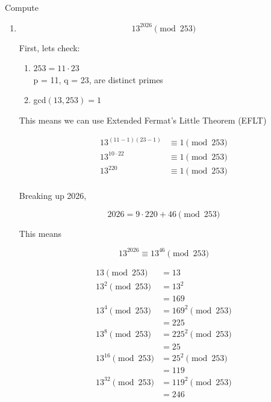 \documentclass[../../Main.tex]{subfiles}
\begin{document}
\begin{example}
    Compute

    \begin{enumerate}
        \item
        {
            $$13^{2026} \pmod{253}$$

            First, lets check:

            \begin{enumerate}
                \item $253 = 11 \cdot 23$ \\ p = 11, q = 23, are distinct primes
                \item gcd$(13, 253) = 1$
            \end{enumerate}

            This means we can use Extended Fermat's Little Theorem (EFLT)

            \begin{align*}
                13^{(11 - 1)(23 - 1)} &\equiv 1 \pmod{253} \\
                13^{10 \cdot 22} &\equiv 1 \pmod{253} \\
                13^{220} &\equiv 1 \pmod{253} \\
            \end{align*}

            Breaking up 2026,

            $$2026 = 9 \cdot 220 + 46 \pmod{253}$$

            This means

            $$13^{2026} \equiv 13^{46} \pmod{253}$$

            \begin{align*}
                13 \pmod{253} &= 13 \\
                13^2 \pmod{253} &= 13^2 \\
                &= 169 \\
                13^4 \pmod{253} &= 169^2 \pmod{253} \\
                &= 225 \\
                13^8 \pmod{253} &= 225^2 \pmod{253} \\
                &= 25 \\
                13^{16} \pmod{253} &= 25^2 \pmod{253} \\
                &= 119 \\
                13^{32} \pmod{253} &= 119^2 \pmod{253} \\
                &= 246 
            \end{align*}

}
\end{enumerate}
\end{example}
\end{document}
